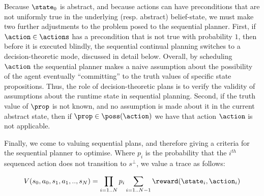 Because $\state_0$ is abstract, and because actions can have
preconditions that are not uniformly true in the underlying
(resp. abstract) belief-state, we must make two further adjustments to
the problem posed to the sequential planner. First, if
$\action\in\actions$ has a precondition that is not true with
probability $1$, then before it is executed blindly, the sequential
continual planning switches to a decision-theoretic mode, discussed in
detail below. Overall, by scheduling $\action$ the sequential planner
makes a naive assumption about the possibility of the agent eventually
``committing'' to the truth values of specific state
propositions. Thus, the role of decision-theoretic plans is to verify
the validity of assumptions about the runtime state in sequential
planning. Second, if the truth value of $\prop$ is not known, and no
assumption is made about it in the current abstract state, then if
$\prop \in
\poss(\action)$ we have that action $\action$ is not applicable.




Finally, we come to valuing sequential plans, and therefore giving a
criteria for the sequential planner to optimise. Where $p_i$ is the
probability that the $i^{th}$ sequenced action does not transition to
$s^\bot$, we value a trace as follows:

\begin{equation}\label{eq:tracevalue}
V(s_0, a_0, s_1, a_1,.., s_N) =  \prod_{i=1..N} p_i \sum_{i=1..N-1} \reward(\state_i, \action_i)
\end{equation}

